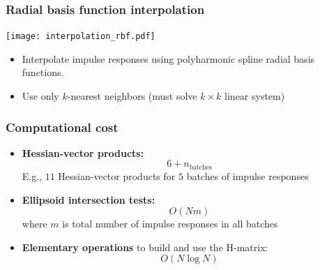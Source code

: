 \documentclass[10pt,final,xcolor=dvipsnames,aspect ratio=169]{beamer}
\begin{document}
\begin{frame}
	\frametitle{Radial basis function interpolation}
	\begin{center}
		\texttt{[image: interpolation\_rbf.pdf]}
	\end{center}
	\begin{itemize}
		\item Interpolate impulse responses using polyharmonic spline radial basis functions.
		\item Use only $k$-nearest neighbors (must solve $k \times k$ linear system)
	\end{itemize}
\end{frame}

\begin{frame}
	\frametitle{Computational cost}
	\begin{itemize}
		\setlength\itemsep{2em}
		\item \textbf{Hessian-vector products:} 
		$$6 + n_\text{batches}$$
		E.g., $11$ Hessian-vector products for $5$ batches of impulse responses
		\item \textbf{Ellipsoid intersection tests:}
		$$O(Nm)$$
		where $m$ is total number of impulse responses in all batches
		\item \textbf{Elementary operations} to build and use the H-matrix:
		$$O(N \log N)$$ 
	\end{itemize}
\end{frame}




\end{document}

